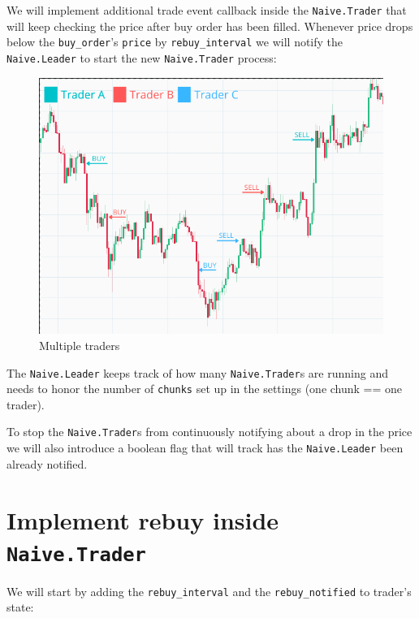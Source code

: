 \documentclass[
]{book}
\begin{document}
We will implement additional trade event callback inside the \texttt{Naive.Trader} that will keep checking the price after buy order has been filled. Whenever price drops below the \texttt{buy\_order}'s \texttt{price} by \texttt{rebuy\_interval} we will notify the \texttt{Naive.Leader} to start the new \texttt{Naive.Trader} process:

\begin{figure}
\centering
\includegraphics{images/chapter_09_02_multi_traders.png}
\caption{Multiple traders}
\end{figure}

The \texttt{Naive.Leader} keeps track of how many \texttt{Naive.Trader}s are running and needs to honor the number of \texttt{chunks} set up in the settings (one chunk == one trader).

To stop the \texttt{Naive.Trader}s from continuously notifying about a drop in the price we will also introduce a boolean flag that will track has the \texttt{Naive.Leader} been already notified.

\hypertarget{implement-rebuy-inside-naive.trader}{%
\section{\texorpdfstring{Implement rebuy inside \texttt{Naive.Trader}}{Implement rebuy inside Naive.Trader}}\label{implement-rebuy-inside-naive.trader}}

We will start by adding the \texttt{rebuy\_interval} and the \texttt{rebuy\_notified} to trader's state:
\end{document}
